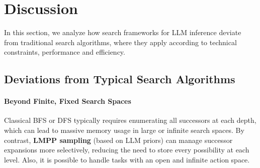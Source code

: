 \section{Discussion}
\label{sec:discussion}
In this section, we analyze how search frameworks for LLM inference deviate from traditional search algorithms, where they apply according to technical constraints, performance and efficiency.

\subsection{Deviations from Typical Search Algorithms}

\paragraph{Beyond Finite, Fixed Search Spaces}
Classical BFS or DFS typically requires enumerating all successors at each depth, which can lead to massive memory usage in large or infinite search spaces. By contrast, \textbf{LMPP sampling} (based on LLM priors) can manage successor expansions more selectively, reducing the need to store every possibility at each level. Also, it is possible to handle tasks with an open and infinite action space.


